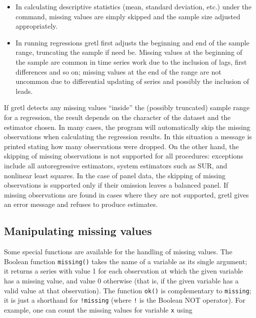 \begin{itemize}
\item In calculating descriptive statistics (mean, standard deviation,
  etc.) under the  command, missing values are simply
  skipped and the sample size adjusted appropriately.
\item In running regressions gretl first adjusts the beginning
  and end of the sample range, truncating the sample if need be.
  Missing values at the beginning of the sample are common in time
  series work due to the inclusion of lags, first differences and so
  on; missing values at the end of the range are not uncommon due to
  differential updating of series and possibly the inclusion of leads.
\end{itemize}

If gretl detects any missing values ``inside'' the (possibly
truncated) sample range for a regression, the result depends on the
character of the dataset and the estimator chosen.  In many cases, the
program will automatically skip the missing observations when
calculating the regression results.  In this situation a message is
printed stating how many observations were dropped.  On the other
hand, the skipping of missing observations is not supported for all
procedures: exceptions include all autoregressive estimators, system
estimators such as SUR, and nonlinear least squares.  In the case of
panel data, the skipping of missing observations is supported only if
their omission leaves a balanced panel. If missing observations are
found in cases where they are not supported, gretl gives an
error message and refuses to produce estimates.

\subsection{Manipulating missing values}
\label{sec:genr-missing}

Some special functions are available for the handling of missing
values.  The Boolean function \verb+missing()+ takes the name of a
variable as its single argument; it returns a series with value 1 for
each observation at which the given variable has a missing value, and
value 0 otherwise (that is, if the given variable has a valid value at
that observation).  The function \verb+ok()+ is complementary to
\verb+missing+; it is just a shorthand for \verb+!missing+ (where
\verb+!+ is the Boolean NOT operator).  For example, one can count the
missing values for variable \verb+x+ using

